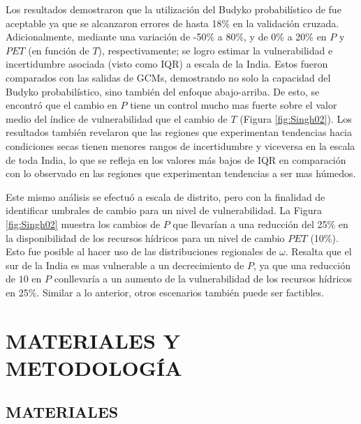 \documentclass[12pt]{article}
\begin{document}
Los resultados demostraron que la utilización del Budyko probabilístico de \citet{Singh2015} fue aceptable ya que se alcanzaron errores de hasta 18\% en la validación cruzada. Adicionalmente, mediante una variación de -50\% a 80\%, y de 0\% a 20\% en $P$ y $PET$ (en función de $T$), respectivamente; se logro estimar la vulnerabilidad e incertidumbre asociada (visto como IQR) a escala de la India. Estos fueron comparados con las salidas de GCMs, demostrando no solo la capacidad del Budyko probabilístico, sino también del enfoque abajo-arriba. De esto, se encontró que el cambio en $P$ tiene un control mucho mas fuerte sobre el valor medio del índice de vulnerabilidad que el cambio de $T$ (Figura \ref{fig:Singh02}). Los resultados también revelaron que las regiones que experimentan tendencias hacia condiciones secas tienen menores rangos de incertidumbre y viceversa en la escala de toda India, lo que se refleja en los valores más bajos de IQR en comparación con lo observado en las regiones que experimentan tendencias a ser mas húmedos.

Este mismo análisis se efectuó a escala de distrito, pero con la finalidad de identificar umbrales de cambio para un nivel de vulnerabilidad. La Figura \ref{fig:Singh02} muestra los cambios de $P$ que llevarían a una reducción del 25\% en la disponibilidad de los recursos hídricos para un nivel de cambio $PET$ (10\%). Esto fue posible al hacer uso de las distribuciones regionales de $\omega$. Resalta que el sur de la India es mas vulnerable a un decrecimiento de $P$, ya que una reducción de $10$ en $P$ conllevaría a un aumento de la vulnerabilidad de los recursos hídricos en 25\%. Similar a lo anterior, otros escenarios también puede ser factibles. 

\clearpage

\clearpage

\clearpage
\vspace*{0.5mm}
\section{MATERIALES Y METODOLOGÍA}

\thispagestyle{empty}

\subsection{MATERIALES}
\end{document}
